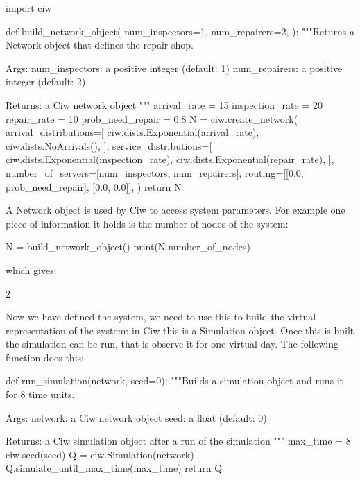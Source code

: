 \begin{pyin}
import ciw


def build_network_object(
    num_inspectors=1,
    num_repairers=2,
):
    """Returns a Network object that defines the repair shop.

    Args:
        num_inspectors: a positive integer (default: 1)
        num_repairers: a positive integer (default: 2)

    Returns:
        a Ciw network object
    """
    arrival_rate = 15
    inspection_rate = 20
    repair_rate = 10
    prob_need_repair = 0.8
    N = ciw.create_network(
        arrival_distributions=[
            ciw.dists.Exponential(arrival_rate),
            ciw.dists.NoArrivals(),
        ],
        service_distributions=[
            ciw.dists.Exponential(inspection_rate),
            ciw.dists.Exponential(repair_rate),
        ],
        number_of_servers=[num_inspectors, num_repairers],
        routing=[[0.0, prob_need_repair], [0.0, 0.0]],
    )
    return N
\end{pyin}

A Network object is used by Ciw to access system parameters. For example one
piece of information it holds is the number of nodes of the system:

\begin{pyin}
N = build_network_object()
print(N.number_of_nodes)
\end{pyin}

which gives:

\begin{pyout}
2
\end{pyout}

Now we have defined the system, we need to use this to build the virtual
representation of the system: in Ciw this is a Simulation object.
Once this is built the simulation can be run, that is observe it for one
virtual day. The following function does this:

\begin{pyin}
def run_simulation(network, seed=0):
    """Builds a simulation object and runs it for 8 time units.

    Args:
        network: a Ciw network object
        seed: a float (default: 0)

    Returns:
        a Ciw simulation object after a run of the simulation
    """
    max_time = 8
    ciw.seed(seed)
    Q = ciw.Simulation(network)
    Q.simulate_until_max_time(max_time)
    return Q
\end{pyin}

